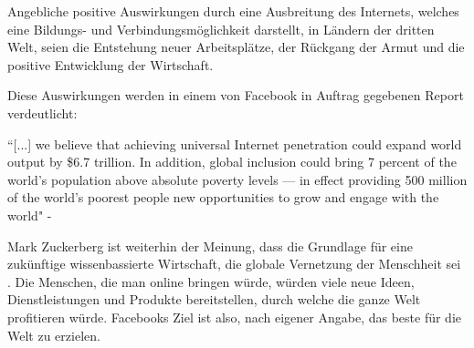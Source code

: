 \documentclass{article}
\begin{document}
\medskip

Angebliche positive Auswirkungen durch eine Ausbreitung des Internets, welches eine Bildungs- und Verbindungsmöglichkeit darstellt, in Ländern der dritten Welt, seien die Entstehung neuer Arbeitsplätze, der Rückgang der Armut und die positive Entwicklung der Wirtschaft.
    
Diese Auswirkungen werden in einem von Facebook in Auftrag gegebenen Report verdeutlicht:
                    
``[...] we believe that achieving universal Internet penetration could expand world output by \$6.7 trillion.  
In addition, global inclusion could bring 7 percent of the world’s population above absolute poverty levels — in effect providing 500 
million of the world’s poorest people new opportunities to grow and engage with the world"
- \cite{connectWorld}

\medskip

Mark Zuckerberg ist weiterhin der Meinung, dass die Grundlage für eine zukünftige wissenbassierte Wirtschaft, die globale Vernetzung der Menschheit sei \parencite{HumanRight}.
Die Menschen, die man online bringen würde, würden viele neue Ideen, Dienstleistungen und Produkte bereitstellen, durch welche die ganze Welt profitieren würde.
Facebooks Ziel ist also, nach eigener Angabe, das beste für die Welt zu erzielen.
\end{document}

